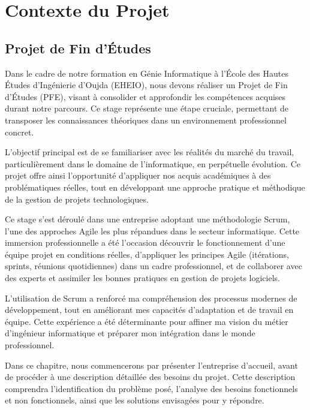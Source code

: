 \documentclass[12pt,a4paper]{report}
\begin{document}
	
	\tableofcontents
	
	\chapter{Contexte du Projet}
	
	\section{Projet de Fin d’Études}
	
	Dans le cadre de notre formation en Génie Informatique à l’École des Hautes Études d’Ingénierie d’Oujda (EHEIO), nous devons réaliser un Projet de Fin d’Études (PFE), visant à consolider et approfondir les compétences acquises durant notre parcours. Ce stage représente une étape cruciale, permettant de transposer les connaissances théoriques dans un environnement professionnel concret.
	
	L’objectif principal est de se familiariser avec les réalités du marché du travail, particulièrement dans le domaine de l’informatique, en perpétuelle évolution. Ce projet offre ainsi l’opportunité d’appliquer nos acquis académiques à des problématiques réelles, tout en développant une approche pratique et méthodique de la gestion de projets technologiques.
	
	Ce stage s’est déroulé dans une entreprise adoptant une méthodologie Scrum, l’une des approches Agile les plus répandues dans le secteur informatique. Cette immersion professionnelle a été l’occasion découvrir le fonctionnement d’une équipe projet en conditions réelles, d'appliquer les principes Agile (itérations, sprints, réunions quotidiennes) dans un cadre professionnel, et de collaborer avec des experts et assimiler les bonnes pratiques en gestion de projets logiciels.
	
	L’utilisation de Scrum a renforcé ma compréhension des processus modernes de développement, tout en améliorant mes capacités d’adaptation et de travail en équipe. Cette expérience a été déterminante pour affiner ma vision du métier d’ingénieur informatique et préparer mon intégration dans le monde professionnel.
	
	Dans ce chapitre, nous commencerons par présenter l’entreprise d’accueil, avant de procéder à une description détaillée des besoins du projet. Cette description comprendra l’identification du problème posé, l’analyse des besoins fonctionnels et non fonctionnels, ainsi que les solutions envisagées pour y répondre.
	
\end{document}
